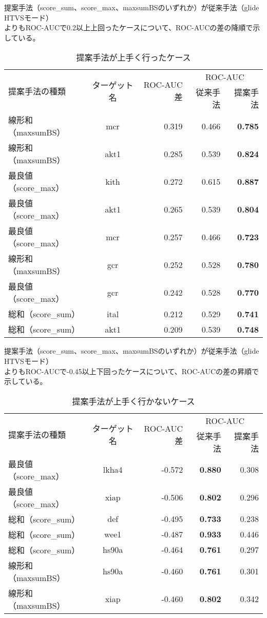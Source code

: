 \begin{table}[htb] \centering
	\caption{提案手法が上手く行ったケース}
	\label{table:target_accuracy_good}
	提案手法（score\_sum、score\_max、maxsumBSのいずれか）が従来手法（glide HTVSモード）\\
	よりもROC-AUCで0.2以上上回ったケースについて、ROC-AUCの差の降順で示している。
	\begin{tabular}{lc|r|rr|}
	\multirow{2}{*}{提案手法の種類}	&\multirow{2}{*}{ターゲット名}	&\multirow{2}{*}{ROC-AUC差}	&\multicolumn{2}{c|}{ROC-AUC}	\\
								&						&							&従来手法	&提案手法		\\ \hline
	線形和（maxsumBS）			&mcr					&0.319						&0.466		&{\bf 0.785}		\\
	線形和（maxsumBS）			&akt1					&0.285						&0.539		&{\bf 0.824}		\\
	最良値（score\_max）			&kith					&0.272						&0.615		&{\bf 0.887}		\\
	最良値（score\_max）			&akt1					&0.265						&0.539		&{\bf 0.804}		\\
	最良値（score\_max）			&mcr					&0.257						&0.466		&{\bf 0.723}		\\
	線形和（maxsumBS）			&gcr						&0.252						&0.528		&{\bf 0.780}		\\
	最良値（score\_max）			&gcr						&0.242						&0.528		&{\bf 0.770}		\\
	総和（score\_sum）				&ital						&0.212						&0.529		&{\bf 0.741}		\\
	総和（score\_sum）				&akt1					&0.209						&0.539		&{\bf 0.748}		\\ \hline
	\end{tabular}
\end{table}
\begin{table}[htb] \centering
	\caption{提案手法が上手く行かないケース}
	\label{table:target_accuracy_bad}
	提案手法（score\_sum、score\_max、maxsumBSのいずれか）が従来手法（glide HTVSモード）\\
	よりもROC-AUCで-0.45以上下回ったケースについて、ROC-AUCの差の昇順で示している。
	\begin{tabular}{lc|r|rr|}
	\multirow{2}{*}{提案手法の種類}	&\multirow{2}{*}{ターゲット名}	&\multirow{2}{*}{ROC-AUC差}	&\multicolumn{2}{c|}{ROC-AUC}	\\
								&						&							&従来手法	&提案手法		\\ \hline
	最良値（score\_max）			&lkha4					&-0.572						&{\bf 0.880}	&0.308			\\
	最良値（score\_max）			&xiap					&-0.506						&{\bf 0.802}	&0.296			\\
	総和（score\_sum）				&def						&-0.495						&{\bf 0.733}	&0.238			\\
	総和（score\_sum）				&wee1					&-0.487						&{\bf 0.933}	&0.446			\\
	総和（score\_sum）				&hs90a					&-0.464						&{\bf 0.761}	&0.297			\\
	線形和（maxsumBS）			&hs90a					&-0.460						&{\bf 0.761}	&0.301			\\
	線形和（maxsumBS）			&xiap					&-0.460						&{\bf 0.802}	&0.342			\\ \hline
	\end{tabular}
\end{table}

